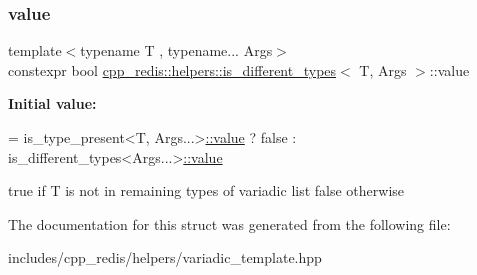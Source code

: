 \subsubsection{\texorpdfstring{value}{value}}
{\footnotesize\ttfamily template$<$typename T , typename... Args$>$ \\
constexpr bool \mbox{\hyperlink{structcpp__redis_1_1helpers_1_1is__different__types}{cpp\+\_\+redis\+::helpers\+::is\+\_\+different\+\_\+types}}$<$ T, Args $>$\+::value\hspace{0.3cm}{\ttfamily [static]}}

{\bfseries Initial value\+:}
\begin{DoxyCode}
= is\_type\_present<T, Args...>\mbox{\hyperlink{structcpp__redis_1_1helpers_1_1is__different__types_a07dadd8ff3c8024734f231aaf1555626}{::value}}
                                  ? false
                                  : is\_different\_types<Args...>\mbox{\hyperlink{structcpp__redis_1_1helpers_1_1is__different__types_a07dadd8ff3c8024734f231aaf1555626}{::value}}
\end{DoxyCode}
true if T is not in remaining types of variadic list false otherwise 

The documentation for this struct was generated from the following file\+:\begin{DoxyCompactItemize}
\item 
includes/cpp\+\_\+redis/helpers/variadic\+\_\+template.\+hpp\end{DoxyCompactItemize}
